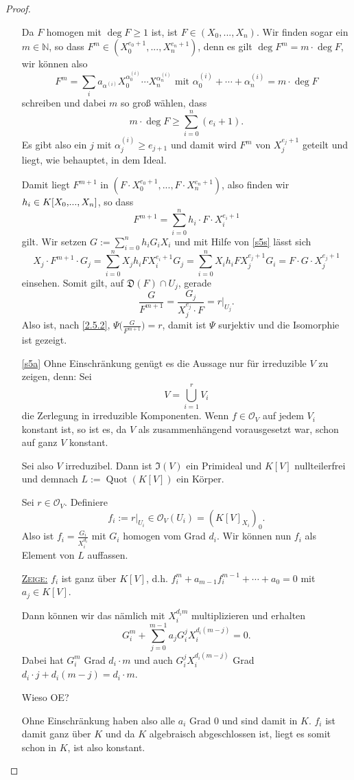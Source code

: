 \documentclass[a4paper,12pt]{scrbook}
\theoremstyle{keinenummern} %
\theoremstyle{mitnummern}
\theoremstyle{unserbeweis}
\newtheorem{proof}{Beweis}
\def\I{\mathfrak{I}}
\def\O{\mathcal{O}}
\newcommand{\D}{\mathfrak{D}}
\newcommand{\Quot}{\operatorname{Quot}}
\newcommand{\restrict}[1]{|_{#1}}
\renewcommand{\dotsc}{\ensuremath{\!...}}
\newcommand{\set}[1]{\ensuremath{\mathbb{#1}}}
\newcommand{\N}{\set{N}}
\newcommand{\ppolyx}[1][n]{\ensuremath%
  [X_{0},\dotsc,X_{#1}]}
\begin{document}
\begin{proof}
\begin{enumerate}
Da $F$ homogen mit $\deg F\geq 1$ ist, ist $F\in(X_{0},\dotsc,X_{n})$. Wir finden sogar ein $m\in\N$, so dass $F^{m}\in(X_{0}^{e_{0}+1},\dotsc,X_{n}^{e_{n}+1})$, denn es gilt $\deg F^{m}=m\cdot\deg F$, wir können also
\[F^{m}=\sum_{i}a_{\alpha^{(i)}}X_{0}^{\alpha_{0}^{(i)}}\dotsm X_{n}^{\alpha_{n}^{(i)}}\text{ mit }\alpha_{0}^{(i)}+\dotsm+\alpha_{n}^{(i)}=m\cdot\deg F\]
schreiben und dabei $m$ so groß wählen, dass
\[m\cdot\deg F\geq\sum_{i=0}^{n}(e_{i}+1).\]
Es gibt also ein $j$ mit $\alpha_{j}^{(i)}\geq e_{j+1}$ und damit wird $F^{m}$ von $X_{j}^{e_{j}+1}$ geteilt und liegt, wie behauptet, in dem Ideal.

Damit liegt $F^{m+1}$ in $(F\cdot X_{0}^{e_{0}+1},\dotsc,F\cdot X_{n}^{e_{n}+1})$, also finden wir $h_{i}\in K\ppolyx$, so dass
\[F^{m+1}=\sum_{i=0}^{n}h_{i}\cdot F\cdot X_{i}^{e_{i}+1}\]
gilt. Wir setzen $\displaystyle G:=\sum_{i=0}^{n}h_{i}G_{i}X_{i}$ und mit Hilfe von \cref{s5s} lässt sich
\[X_{j}\cdot F^{m+1}\cdot G_{j}=\sum_{i=0}^{n}X_{j}h_{i}FX_{i}^{e_{i}+1}G_{j}=\sum_{i=0}^{n}X_{i}h_{i}FX_{j}^{e_{j}+1}G_{i}=F\cdot G\cdot X_{j}^{e_{j}+1}\]
einsehen. Somit gilt, auf $\D(F)\cap U_{j}$, gerade \[\frac{G}{F^{m+1}}=\frac{G_{j}}{X_{j}^{e_{j}}\cdot F}=r\restrict{U_{j}}.\] Also ist, nach \cref{2.5.2}, $\Psi\bigl(\frac{G}{F^{m+1}}\bigr)=r$, damit ist $\Psi$ surjektiv und die Isomorphie ist gezeigt.

\item[\ref{s5a}] Ohne Einschränkung genügt es die Aussage nur für irreduzible $V$ zu zeigen, denn: Sei
\[V=\bigcup_{i=1}^{r}V_{i}\]
die Zerlegung in irreduzible Komponenten. Wenn $f\in\O_{V}$ auf jedem $V_{i}$ konstant ist, so ist es, da $V$ als zusammenhängend vorausgesetzt war, schon auf ganz $V$ konstant.

Sei also $V$ irreduzibel. Dann ist $\I(V)$ ein Primideal und $K[V]$ nullteilerfrei und demnach $L:=\Quot(K[V])$ ein Körper.

Sei $r\in\O_{V}$. Definiere
\[f_{i}:=r\restrict{U_{i}}\in\O_{V}(U_{i})=(K[V]_{X_{i}})_{0}.\]
Also ist $f_{i}=\frac{G_{i}}{X_{i}^{d_{i}}}$ mit $G_{i}$ homogen vom Grad $d_{i}$. Wir können nun $f_{i}$ als Element von $L$ auffassen.

\hyperlink{s5bzz}{{\scshape Zeige:}} $f_{i}$ ist ganz über $K[V]$, d.h. $f_{i}^{m}+a_{m-1}f_{i}^{m-1}+\dotsm+a_{0}=0$ mit $a_{j}\in K[V]$.

Dann können wir das nämlich mit $X_{i}^{d_{i}m}$ multiplizieren und erhalten
\[G_{i}^{m}+\sum_{j=0}^{m-1}a_{j}G_{i}^{j}X_{i}^{d_{i}(m-j)}=0.\]
Dabei hat $G_{i}^{m}$ Grad $d_{i}\cdot m$ und auch $G_{i}^{j}X_{i}^{d_{i}(m-j)}$ Grad $d_{i}\cdot j+d_{i}(m-j)=d_{i}\cdot m$.
\begin{w}Wieso OE?\end{w}
Ohne Einschränkung haben also alle $a_{i}$ Grad $0$ und sind damit in $K$. $f_{i}$ ist damit ganz über $K$ und da $K$ algebraisch abgeschlossen ist, liegt es somit schon in $K$, ist also konstant.


\end{enumerate}
\end{proof}
\end{document}
